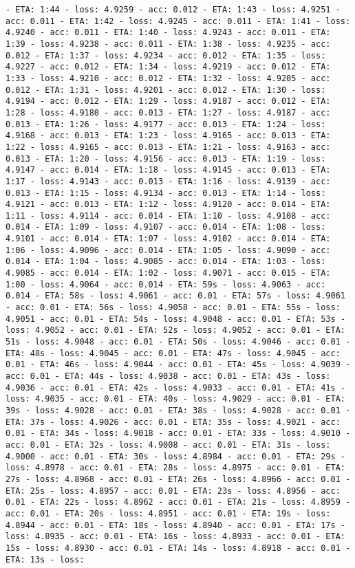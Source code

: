 \documentclass[11pt]{article}
\begin{document}
\begin{Verbatim}[commandchars=\\\{\}]
- ETA: 1:44 - loss: 4.9259 - acc: 0.012 - ETA: 1:43 - loss: 4.9251 - acc: 0.011 - ETA: 1:42 - loss: 4.9245 - acc: 0.011 - ETA: 1:41 - loss: 4.9240 - acc: 0.011 - ETA: 1:40 - loss: 4.9243 - acc: 0.011 - ETA: 1:39 - loss: 4.9238 - acc: 0.011 - ETA: 1:38 - loss: 4.9235 - acc: 0.012 - ETA: 1:37 - loss: 4.9234 - acc: 0.012 - ETA: 1:35 - loss: 4.9227 - acc: 0.012 - ETA: 1:34 - loss: 4.9219 - acc: 0.012 - ETA: 1:33 - loss: 4.9210 - acc: 0.012 - ETA: 1:32 - loss: 4.9205 - acc: 0.012 - ETA: 1:31 - loss: 4.9201 - acc: 0.012 - ETA: 1:30 - loss: 4.9194 - acc: 0.012 - ETA: 1:29 - loss: 4.9187 - acc: 0.012 - ETA: 1:28 - loss: 4.9180 - acc: 0.013 - ETA: 1:27 - loss: 4.9187 - acc: 0.013 - ETA: 1:26 - loss: 4.9177 - acc: 0.013 - ETA: 1:24 - loss: 4.9168 - acc: 0.013 - ETA: 1:23 - loss: 4.9165 - acc: 0.013 - ETA: 1:22 - loss: 4.9165 - acc: 0.013 - ETA: 1:21 - loss: 4.9163 - acc: 0.013 - ETA: 1:20 - loss: 4.9156 - acc: 0.013 - ETA: 1:19 - loss: 4.9147 - acc: 0.014 - ETA: 1:18 - loss: 4.9145 - acc: 0.013 - ETA: 1:17 - loss: 4.9143 - acc: 0.013 - ETA: 1:16 - loss: 4.9139 - acc: 0.013 - ETA: 1:15 - loss: 4.9134 - acc: 0.013 - ETA: 1:14 - loss: 4.9121 - acc: 0.013 - ETA: 1:12 - loss: 4.9120 - acc: 0.014 - ETA: 1:11 - loss: 4.9114 - acc: 0.014 - ETA: 1:10 - loss: 4.9108 - acc: 0.014 - ETA: 1:09 - loss: 4.9107 - acc: 0.014 - ETA: 1:08 - loss: 4.9101 - acc: 0.014 - ETA: 1:07 - loss: 4.9102 - acc: 0.014 - ETA: 1:06 - loss: 4.9096 - acc: 0.014 - ETA: 1:05 - loss: 4.9090 - acc: 0.014 - ETA: 1:04 - loss: 4.9085 - acc: 0.014 - ETA: 1:03 - loss: 4.9085 - acc: 0.014 - ETA: 1:02 - loss: 4.9071 - acc: 0.015 - ETA: 1:00 - loss: 4.9064 - acc: 0.014 - ETA: 59s - loss: 4.9063 - acc: 0.014 - ETA: 58s - loss: 4.9061 - acc: 0.01 - ETA: 57s - loss: 4.9061 - acc: 0.01 - ETA: 56s - loss: 4.9058 - acc: 0.01 - ETA: 55s - loss: 4.9051 - acc: 0.01 - ETA: 54s - loss: 4.9048 - acc: 0.01 - ETA: 53s - loss: 4.9052 - acc: 0.01 - ETA: 52s - loss: 4.9052 - acc: 0.01 - ETA: 51s - loss: 4.9048 - acc: 0.01 - ETA: 50s - loss: 4.9046 - acc: 0.01 - ETA: 48s - loss: 4.9045 - acc: 0.01 - ETA: 47s - loss: 4.9045 - acc: 0.01 - ETA: 46s - loss: 4.9044 - acc: 0.01 - ETA: 45s - loss: 4.9039 - acc: 0.01 - ETA: 44s - loss: 4.9038 - acc: 0.01 - ETA: 43s - loss: 4.9036 - acc: 0.01 - ETA: 42s - loss: 4.9033 - acc: 0.01 - ETA: 41s - loss: 4.9035 - acc: 0.01 - ETA: 40s - loss: 4.9029 - acc: 0.01 - ETA: 39s - loss: 4.9028 - acc: 0.01 - ETA: 38s - loss: 4.9028 - acc: 0.01 - ETA: 37s - loss: 4.9026 - acc: 0.01 - ETA: 35s - loss: 4.9021 - acc: 0.01 - ETA: 34s - loss: 4.9018 - acc: 0.01 - ETA: 33s - loss: 4.9010 - acc: 0.01 - ETA: 32s - loss: 4.9008 - acc: 0.01 - ETA: 31s - loss: 4.9000 - acc: 0.01 - ETA: 30s - loss: 4.8984 - acc: 0.01 - ETA: 29s - loss: 4.8978 - acc: 0.01 - ETA: 28s - loss: 4.8975 - acc: 0.01 - ETA: 27s - loss: 4.8968 - acc: 0.01 - ETA: 26s - loss: 4.8966 - acc: 0.01 - ETA: 25s - loss: 4.8957 - acc: 0.01 - ETA: 23s - loss: 4.8956 - acc: 0.01 - ETA: 22s - loss: 4.8962 - acc: 0.01 - ETA: 21s - loss: 4.8959 - acc: 0.01 - ETA: 20s - loss: 4.8951 - acc: 0.01 - ETA: 19s - loss: 4.8944 - acc: 0.01 - ETA: 18s - loss: 4.8940 - acc: 0.01 - ETA: 17s - loss: 4.8935 - acc: 0.01 - ETA: 16s - loss: 4.8933 - acc: 0.01 - ETA: 15s - loss: 4.8930 - acc: 0.01 - ETA: 14s - loss: 4.8918 - acc: 0.01 - ETA: 13s - loss: 
\end{Verbatim}
\end{document}
